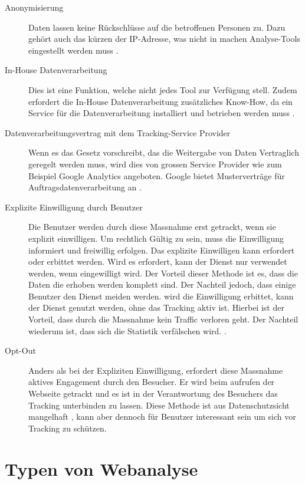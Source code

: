 \begin{description}
  \item[Anonymisierung] Daten lassen keine Rückschlüsse auf die betroffenen Personen zu. Dazu gehört auch das kürzen der IP-Adresse, was nicht in machen Analyse-Tools eingestellt werden muss \parencite[S. 3]{EcommerceUndDatenschutz}.
  \item[In-House Datenverarbeitung] Dies ist eine Funktion, welche nicht jedes Tool zur Verfügung stell. Zudem erfordert die In-House Datenverarbeitung zusätzliches Know-How, da ein Service für die Datenverarbeitung installiert und betrieben werden muss \parencite[S. 175]{nakatani2011toolselectionmethod}. 
  \item[Datenverarbeitungsvertrag mit dem Tracking-Service Provider] Wenn es das Gesetz vorschreibt, das die Weitergabe von Daten Vertraglich geregelt werden muss, wird dies von grossen Service Provider wie zum Beispiel Google Analytics angeboten. Google bietet Musterverträge für Auftragsdatenverarbeitung an \parencite[S. 5]{EcommerceUndDatenschutz}. 
  \item[Explizite Einwilligung durch Benutzer] Die Benutzer werden durch diese Massnahme erst getrackt, wenn sie explizit einwilligen. Um rechtlich Gültig zu sein, muss die Einwilligung informiert und freiwillig erfolgen. Das explizite Einwilligen kann erfordert oder erbittet werden. Wird es erfordert, kann der Dienst nur verwendet werden, wenn eingewilligt wird. Der Vorteil dieser Methode ist es, dass die Daten die erhoben werden komplett sind. Der Nachteil jedoch, dass einige Benutzer den Dienst meiden werden. wird die Einwilligung erbittet, kann der Dienst genutzt werden, ohne das Tracking aktiv ist. Hierbei ist der Vorteil, dass durch die Massnahme kein Traffic verloren geht. Der Nachteil wiederum ist, dass sich die Statistik verfälschen wird. \parencite[S. 2-3]{EcommerceUndDatenschutz}.
  \item[Opt-Out] Anders als bei der Expliziten Einwilligung, erfordert diese Massnahme aktives Engagement durch den Besucher. Er wird beim aufrufen der Webseite getrackt und es ist in der Verantwortung des Besuchers das Tracking unterbinden zu lassen. Diese Methode ist aus Datenschutzsicht mangelhaft \parencite[§§ 9 Abs. 4]{DSSGBERN}, kann aber dennoch für Benutzer interessant sein um sich vor Tracking zu schützen.
\end{description}

\newpage
\section{Typen von Webanalyse}

